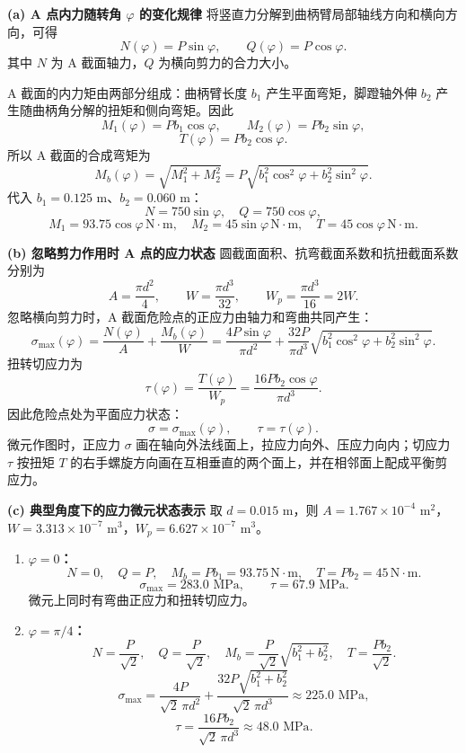 \documentclass[11pt,a4paper]{ctexrep}
\begin{document}
{\textbf{(a) A 点内力随转角 $\varphi$ 的变化规律}
将竖直力分解到曲柄臂局部轴线方向和横向方向，可得
\[
    N(\varphi)=P\sin\varphi,\qquad Q(\varphi)=P\cos\varphi.
\]
其中 $N$ 为 A 截面轴力，$Q$ 为横向剪力的合力大小。

A 截面的内力矩由两部分组成：曲柄臂长度 $b_1$ 产生平面弯矩，脚蹬轴外伸 $b_2$ 产生随曲柄角分解的扭矩和侧向弯矩。因此
\[
    M_1(\varphi)=P b_1\cos\varphi,\qquad
    M_2(\varphi)=P b_2\sin\varphi,
\]
\[
    T(\varphi)=P b_2\cos\varphi.
\]
所以 A 截面的合成弯矩为
\[
    M_b(\varphi)=\sqrt{M_1^2+M_2^2}
    =P\sqrt{b_1^2\cos^2\varphi+b_2^2\sin^2\varphi}.
\]
代入 $b_1=0.125\text{ m}$、$b_2=0.060\text{ m}$：
\[
    N=750\sin\varphi,\quad Q=750\cos\varphi,
\]
\[
    M_1=93.75\cos\varphi\,\mathrm{N\cdot m},\quad
    M_2=45\sin\varphi\,\mathrm{N\cdot m},\quad
    T=45\cos\varphi\,\mathrm{N\cdot m}.
\]

\textbf{(b) 忽略剪力作用时 A 点的应力状态}
圆截面面积、抗弯截面系数和抗扭截面系数分别为
\[
    A=\frac{\pi d^2}{4},\qquad W=\frac{\pi d^3}{32},\qquad W_p=\frac{\pi d^3}{16}=2W.
\]
忽略横向剪力时，A 截面危险点的正应力由轴力和弯曲共同产生：
\[
    \sigma_{\max}(\varphi)
    =\frac{N(\varphi)}{A}+\frac{M_b(\varphi)}{W}
    =\frac{4P\sin\varphi}{\pi d^2}
    +\frac{32P}{\pi d^3}
      \sqrt{b_1^2\cos^2\varphi+b_2^2\sin^2\varphi}.
\]
扭转切应力为
\[
    \tau(\varphi)=\frac{T(\varphi)}{W_p}
    =\frac{16P b_2\cos\varphi}{\pi d^3}.
\]
因此危险点处为平面应力状态：
\[
    \sigma=\sigma_{\max}(\varphi),\qquad \tau=\tau(\varphi).
\]
微元作图时，正应力 $\sigma$ 画在轴向外法线面上，拉应力向外、压应力向内；切应力 $\tau$ 按扭矩 $T$ 的右手螺旋方向画在互相垂直的两个面上，并在相邻面上配成平衡剪应力。

\textbf{(c) 典型角度下的应力微元状态表示}
取 $d=0.015\text{ m}$，则 $A=1.767\times10^{-4}\text{ m}^2$，$W=3.313\times10^{-7}\text{ m}^3$，$W_p=6.627\times10^{-7}\text{ m}^3$。
\begin{enumerate}
    \item \textbf{$\varphi=0$：}
    \[
        N=0,\quad Q=P,\quad M_b=P b_1=93.75\,\mathrm{N\cdot m},\quad T=P b_2=45\,\mathrm{N\cdot m}.
    \]
    \[
        \sigma_{\max}=283.0\text{ MPa},\qquad \tau=67.9\text{ MPa}.
    \]
    微元上同时有弯曲正应力和扭转切应力。

    \item \textbf{$\varphi=\pi/4$：}
    \[
        N=\frac{P}{\sqrt2},\quad Q=\frac{P}{\sqrt2},\quad
        M_b=\frac{P}{\sqrt2}\sqrt{b_1^2+b_2^2},\quad
        T=\frac{P b_2}{\sqrt2}.
    \]
    \[
        \sigma_{\max}
        =\frac{4P}{\sqrt2\,\pi d^2}
        +\frac{32P\sqrt{b_1^2+b_2^2}}{\sqrt2\,\pi d^3}
        \approx 225.0\text{ MPa},
    \]
    \[
        \tau=\frac{16P b_2}{\sqrt2\,\pi d^3}\approx48.0\text{ MPa}.
    \]


\end{enumerate}}
\end{document}
